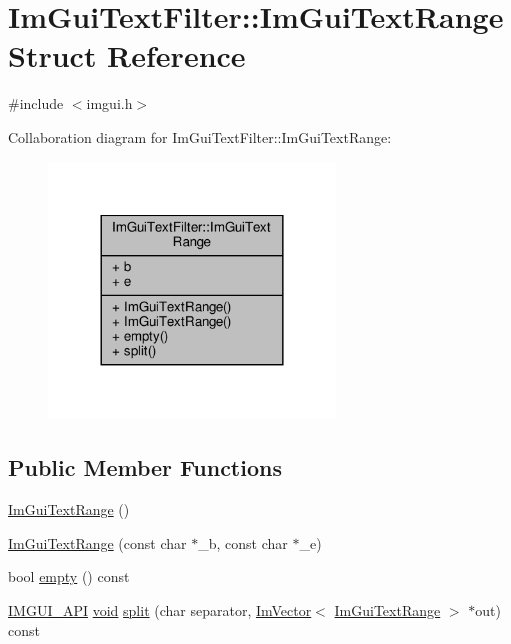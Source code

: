 \hypertarget{structImGuiTextFilter_1_1ImGuiTextRange}{}\section{Im\+Gui\+Text\+Filter\+:\+:Im\+Gui\+Text\+Range Struct Reference}
\label{structImGuiTextFilter_1_1ImGuiTextRange}


{\ttfamily \#include $<$imgui.\+h$>$}



Collaboration diagram for Im\+Gui\+Text\+Filter\+:\+:Im\+Gui\+Text\+Range\+:
\nopagebreak
\begin{figure}[H]
\begin{center}
\leavevmode
\includegraphics[width=216pt]{structImGuiTextFilter_1_1ImGuiTextRange__coll__graph}
\end{center}
\end{figure}
\subsection*{Public Member Functions}
\begin{DoxyCompactItemize}
\item 
\hyperlink{structImGuiTextFilter_1_1ImGuiTextRange_a39c1ebebef36566bfec95d2cc4fccc4c}{Im\+Gui\+Text\+Range} ()
\item 
\hyperlink{structImGuiTextFilter_1_1ImGuiTextRange_aa6912a579ec0907976635b89a9a23da0}{Im\+Gui\+Text\+Range} (const char $\ast$\+\_\+b, const char $\ast$\+\_\+e)
\item 
bool \hyperlink{structImGuiTextFilter_1_1ImGuiTextRange_a1861f25905e1f19f979998faf5349b5a}{empty} () const
\item 
\hyperlink{imgui_8h_a43829975e84e45d1149597467a14bbf5}{I\+M\+G\+U\+I\+\_\+\+A\+PI} \hyperlink{imgui__impl__opengl3__loader_8h_ac668e7cffd9e2e9cfee428b9b2f34fa7}{void} \hyperlink{structImGuiTextFilter_1_1ImGuiTextRange_ace58f9b4795033f695344a0e660ee2af}{split} (char separator, \hyperlink{structImVector}{Im\+Vector}$<$ \hyperlink{structImGuiTextFilter_1_1ImGuiTextRange}{Im\+Gui\+Text\+Range} $>$ $\ast$out) const
\end{DoxyCompactItemize}
